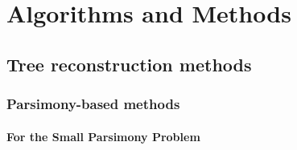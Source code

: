 %


\part{Algorithms and Methods}



\chapter{Tree reconstruction methods}
\section{Parsimony-based methods}   
\subsection{For the Small Parsimony Problem}



